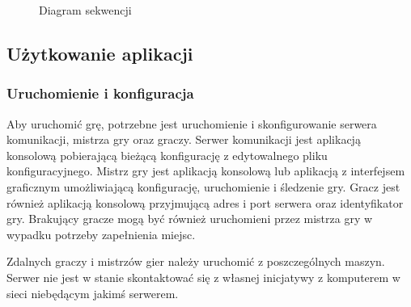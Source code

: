 \documentclass[11pt]{article}
\let\Oldsubsection\subsection
\renewcommand{\subsection}{\FloatBarrier\Oldsubsection}
\let\Oldsubsubsection\subsubsection
\renewcommand{\subsubsection}{\FloatBarrier\Oldsubsubsection}
\begin{document}
\begin{figure}[!h]
	\centering
	\caption{Diagram sekwencji}
\end{figure}

\subsection{Użytkowanie aplikacji}

\subsubsection{Uruchomienie i konfiguracja}
\par
Aby uruchomić grę, potrzebne jest uruchomienie i skonfigurowanie serwera komunikacji, mistrza gry oraz graczy. Serwer komunikacji jest aplikacją konsolową pobierającą bieżącą konfigurację z edytowalnego pliku konfiguracyjnego. Mistrz gry jest aplikacją konsolową lub aplikacją z interfejsem graficznym umożliwiającą konfigurację, uruchomienie i śledzenie gry. Gracz jest również aplikacją konsolową przyjmującą adres i port serwera oraz identyfikator gry. Brakujący gracze mogą być również uruchomieni przez mistrza gry w wypadku potrzeby zapełnienia miejsc.
\par
Zdalnych graczy i mistrzów gier należy uruchomić z poszczególnych maszyn. Serwer nie jest w stanie skontaktować się z własnej inicjatywy z komputerem w sieci niebędącym jakimś serwerem.
\end{document}
